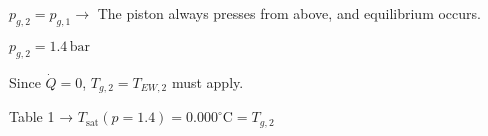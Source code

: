 \( p_{g,2} = p_{g,1} \rightarrow \) The piston always presses from above, and equilibrium occurs.  

\( p_{g,2} = 1.4 \, \text{bar} \)  

Since \( \dot{Q} = 0 \), \( T_{g,2} = T_{EW,2} \) must apply.  

Table 1 → \( T_{\text{sat}} (p = 1.4) = 0.000^\circ \text{C} = T_{g,2} \)